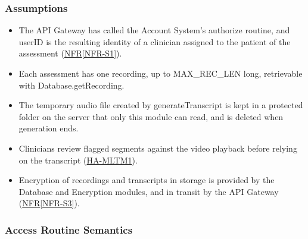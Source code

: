 \documentclass[12pt, titlepage]{article}
\newcommand{\srsref}[2]{\href{https://github.com/Nour-Fawaz/MacaBoca/blob/main/pdfs/SRS/SRS.pdf}{#1\ref*{#2}}}
\newcommand{\hazref}[1]{\href{https://github.com/Nour-Fawaz/MacaBoca/blob/main/pdfs/HazardAnalysis/HazardAnalysis.pdf}{#1}}
\begin{document}
\subsubsection{Assumptions}
\begin{itemize}
\item The API Gateway has called the Account System's authorize routine, and userID is the resulting identity of a clinician assigned to the patient of the assessment (\srsref{NFR}{NFR-S1}).
\item Each assessment has one recording, up to MAX\_REC\_LEN long, retrievable with Database.getRecording.
\item The temporary audio file created by generateTranscript is kept in a protected folder on the server that only this module can read, and is deleted when generation ends.
\item Clinicians review flagged segments against the video playback before relying on the transcript (\hazref{HA-MLTM1}).
\item Encryption of recordings and transcripts in storage is provided by the Database and Encryption modules, and in transit by the API Gateway (\srsref{NFR}{NFR-S3}).
\end{itemize}

\subsubsection{Access Routine Semantics}
\end{document}
